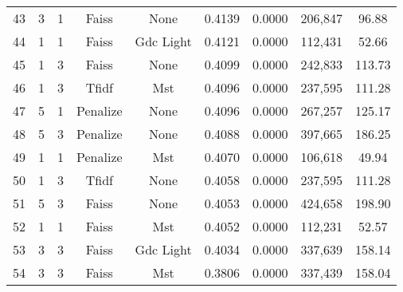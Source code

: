 \begin{longtable}{@{}ccccccccc@{}}
43 & 3 & 1 & Faiss & None & 0.4139 & 0.0000 & 206,847 & 96.88 \\
44 & 1 & 1 & Faiss & Gdc Light & 0.4121 & 0.0000 & 112,431 & 52.66 \\
45 & 1 & 3 & Faiss & None & 0.4099 & 0.0000 & 242,833 & 113.73 \\
46 & 1 & 3 & Tfidf & Mst & 0.4096 & 0.0000 & 237,595 & 111.28 \\
47 & 5 & 1 & Penalize & None & 0.4096 & 0.0000 & 267,257 & 125.17 \\
48 & 5 & 3 & Penalize & None & 0.4088 & 0.0000 & 397,665 & 186.25 \\
49 & 1 & 1 & Penalize & Mst & 0.4070 & 0.0000 & 106,618 & 49.94 \\
50 & 1 & 3 & Tfidf & None & 0.4058 & 0.0000 & 237,595 & 111.28 \\
51 & 5 & 3 & Faiss & None & 0.4053 & 0.0000 & 424,658 & 198.90 \\
52 & 1 & 1 & Faiss & Mst & 0.4052 & 0.0000 & 112,231 & 52.57 \\
53 & 3 & 3 & Faiss & Gdc Light & 0.4034 & 0.0000 & 337,639 & 158.14 \\
54 & 3 & 3 & Faiss & Mst & 0.3806 & 0.0000 & 337,439 & 158.04 \\
\end{longtable}